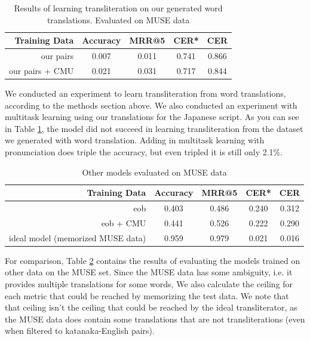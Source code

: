 \documentclass{article}
\begin{document}
\begin{table}[h]
  \centering
  \begin{tabular}{r | c c c c}
    \toprule
    Training Data & Accuracy & MRR@5 & CER* & CER \\
    \midrule
    our pairs & 0.007 & 0.011 & 0.741 & 0.866 \\
    our pairs + CMU & 0.021 & 0.031 & 0.717 & 0.844 \\
    \bottomrule
  \end{tabular}
  \caption{Results of learning transliteration on our generated word
    translations. Evaluated on MUSE data}
  \label{tab:our-muse}
\end{table}

We conducted an experiment to learn transliteration from word translations,
according to the methods section above.
We also conducted an experiment with multitask learning
using our translations for the Japanese script.
As you can see in Table \ref{tab:our-muse},
the model did not succeed in learning transliteration
from the dataset we generated with word translation.
Adding in multitask learning with pronunciation does triple the accuracy,
but even tripled it is still only 2.1\%.

\begin{table}[h]
  \centering
  \begin{tabular}{r | c c c c}
    \toprule
    Training Data & Accuracy & MRR@5 & CER* & CER \\
    \midrule
    eob & 0.403 & 0.486 & 0.240 & 0.312 \\
    eob + CMU & 0.441 & 0.526 & 0.222 & 0.290 \\
    \midrule
    ideal model (memorized MUSE data) & 0.959 & 0.979 & 0.021 & 0.016\\
    \bottomrule
  \end{tabular}
  \caption{Other models evaluated on MUSE data}
  \label{tab:other-muse}
\end{table}

For comparison,
Table \ref{tab:other-muse} contains the results of evaluating
the models trained on other data on the MUSE set.
Since the MUSE data has some ambiguity,
i.e. it provides multiple translations for some words,
We also calculate the ceiling for each metric
that could be reached by memorizing the test data.
We note that that ceiling isn't
the ceiling that could be reached by the ideal transliterator,
as the MUSE data does contain some translations that are not transliterations
(even when filtered to katanaka-English pairs).
\end{document}

